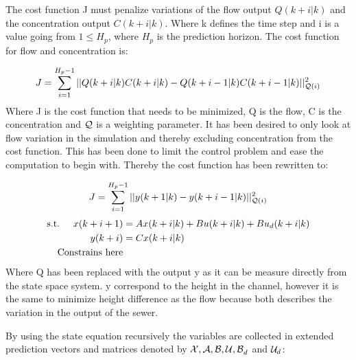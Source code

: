 The cost function J must penalize variations of the flow output $Q(k+i|k)$ and the concentration output $C(k+i|k)$. Where k defines the time step and i is a value going from $1\leq H_p$, where $H_p$ is the prediction horizon. The cost function for flow and concentration is:

\begin{equation}
	 J = \sum_{i=1}^{H_p-1} || Q(k+i|k)C(k+i|k)-Q(k+i-1|k)C(k+i-1|k)||_{\CMcal{Q}(i)}^2
\end{equation}
Where J is the cost function that needs to be minimized, Q is the flow, C is the concentration and $\CMcal{Q}$ is a weighting parameter. It has been desired to only look at flow variation in the simulation and thereby excluding concentration from the cost function. This has been done to limit the control problem and ease the computation to begin with. Thereby the cost function has been rewritten to: 

\begin{equation}
	 J = \sum_{i=1}^{H_p-1} || y(k+1|k)-y(k+i-1|k)||_{\CMcal{Q}(i)}^2
\end{equation}
\begin{equation}
	\begin{aligned}
	\text{s.t.} \hspace{5mm}  x(k+i+1) &= Ax(k+i|k)+Bu(k+i|k)+Bu_d(k+i|k) \\
						      y(k+i)&= Cx(k+i|k) \\
						      \text{Constrains here}
	\end{aligned}
\end{equation}
Where Q has been replaced with the output y as it can be measure directly from the state space system. y correspond to the height in the channel, however it is the same to minimize height difference as the flow because both describes the variation in the output of the sewer. 


By using the state equation recursively the variables are collected in extended prediction vectors and matrices denoted by $\CMcal{X,A,B,U,B}_d$ and $\CMcal{U}_d$:


